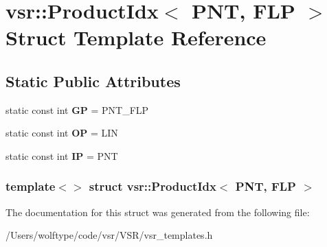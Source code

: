 \hypertarget{structvsr_1_1_product_idx_3_01_p_n_t_00_01_f_l_p_01_4}{\section{vsr\-:\-:Product\-Idx$<$ P\-N\-T, F\-L\-P $>$ Struct Template Reference}
\label{structvsr_1_1_product_idx_3_01_p_n_t_00_01_f_l_p_01_4}
}
\subsection*{Static Public Attributes}
\begin{DoxyCompactItemize}
\item 
\hypertarget{structvsr_1_1_product_idx_3_01_p_n_t_00_01_f_l_p_01_4_a3f103e4b76a6584426b9cf806bb06e10}{static const int {\bfseries G\-P} = P\-N\-T\-\_\-\-F\-L\-P}\label{structvsr_1_1_product_idx_3_01_p_n_t_00_01_f_l_p_01_4_a3f103e4b76a6584426b9cf806bb06e10}

\item 
\hypertarget{structvsr_1_1_product_idx_3_01_p_n_t_00_01_f_l_p_01_4_aab60a73e40adb1b2ebd037abe4de0155}{static const int {\bfseries O\-P} = L\-I\-N}\label{structvsr_1_1_product_idx_3_01_p_n_t_00_01_f_l_p_01_4_aab60a73e40adb1b2ebd037abe4de0155}

\item 
\hypertarget{structvsr_1_1_product_idx_3_01_p_n_t_00_01_f_l_p_01_4_a42ffb2c7534d71d21ef15113c691a13e}{static const int {\bfseries I\-P} = P\-N\-T}\label{structvsr_1_1_product_idx_3_01_p_n_t_00_01_f_l_p_01_4_a42ffb2c7534d71d21ef15113c691a13e}

\end{DoxyCompactItemize}
\subsubsection*{template$<$$>$ struct vsr\-::\-Product\-Idx$<$ P\-N\-T, F\-L\-P $>$}



The documentation for this struct was generated from the following file\-:\begin{DoxyCompactItemize}
\item 
/\-Users/wolftype/code/vsr/\-V\-S\-R/vsr\-\_\-templates.\-h\end{DoxyCompactItemize}
